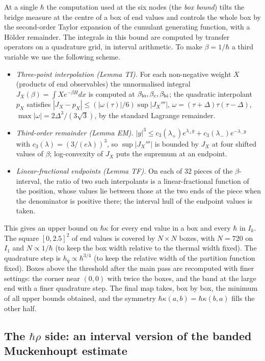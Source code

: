 \documentclass[11pt,a4paper]{article}
\theoremstyle{definition}
\theoremstyle{remark}
\newcommand{\hk}{\hbar\kappa}
\begin{document}
At a single $\hbar$ the computation used at the six nodes (the \emph{box bound}) tilts the bridge measure at the centre of a box of end values and controls the whole box by the second-order Taylor expansion of the cumulant generating function, with a Hölder remainder. The integrals in this bound are computed by transfer operators on a quadrature grid, in interval arithmetic. To make $\beta=1/\hbar$ a third variable we use the following scheme.
\begin{itemize}[leftmargin=2em]
\item \emph{Three-point interpolation (Lemma TI).} For each non-negative weight $X$ (products of end observables) the unnormalised integral $J_X(\beta)=\int Xe^{-\beta H}dx$ is computed at $\beta_{\rm lo},\beta_c,\beta_{\rm hi}$; the quadratic interpolant $p_X$ satisfies $|J_X-p_X|\le(|\omega(\tau)|/6)\sup|J_X'''|$, $\omega=(\tau+\Delta)\tau(\tau-\Delta)$, $\max|\omega|=2\Delta^3/(3\sqrt3)$, by the standard Lagrange remainder.
\item \emph{Third-order remainder (Lemma EM).} $|y|^3\le c_3(\lambda_+)e^{\lambda_+y}+c_3(\lambda_-)e^{-\lambda_-y}$ with $c_3(\lambda)=(3/(e\lambda))^3$, so $\sup|J_X'''|$ is bounded by $J_X$ at four shifted values of $\beta$; log-convexity of $J_X$ puts the supremum at an endpoint.
\item \emph{Linear-fractional endpoints (Lemma TF).} On each of $32$ pieces of the $\beta$-interval, the ratio of two such interpolants is a linear-fractional function of the position, whose values lie between those at the two ends of the piece when the denominator is positive there; the interval hull of the endpoint values is taken.
\end{itemize}
This gives an upper bound on $\hk$ for every end value in a box and every $\hbar$ in $I_k$. The square $[0,2.5]^2$ of end values is covered by $N\times N$ boxes, with $N=720$ on $I_1$ and $N\propto1/\hbar$ (to keep the box width relative to the thermal width fixed). The quadrature step is $h_q\propto\hbar^{3/4}$ (to keep the relative width of the partition function fixed). Boxes above the threshold after the main pass are recomputed with finer settings: the corner near $(0,0)$ with twice the boxes, and the band at the large end with a finer quadrature step. The final map takes, box by box, the minimum of all upper bounds obtained, and the symmetry $\hk(a,b)=\hk(b,a)$ fills the other half.

\subsection{The \texorpdfstring{$\hbar\rho$}{hbar rho} side: an interval version of the banded Muckenhoupt estimate}\label{sec:hr}
\end{document}
